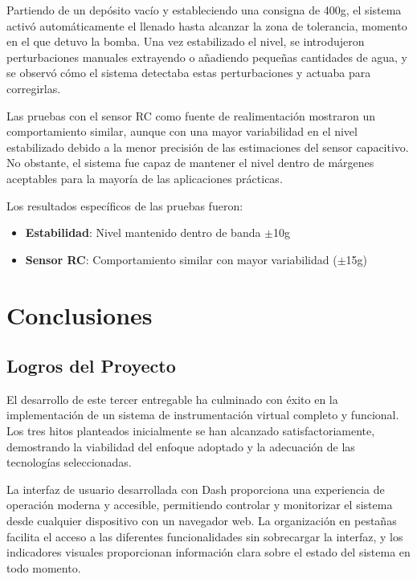 \documentclass[12pt,a4paper]{article}
\begin{document}
Partiendo de un depósito vacío y estableciendo una consigna de 400g, el sistema activó automáticamente el llenado hasta alcanzar la zona de tolerancia, momento en el que detuvo la bomba. Una vez estabilizado el nivel, se introdujeron perturbaciones manuales extrayendo o añadiendo pequeñas cantidades de agua, y se observó cómo el sistema detectaba estas perturbaciones y actuaba para corregirlas.

Las pruebas con el sensor RC como fuente de realimentación mostraron un comportamiento similar, aunque con una mayor variabilidad en el nivel estabilizado debido a la menor precisión de las estimaciones del sensor capacitivo. No obstante, el sistema fue capaz de mantener el nivel dentro de márgenes aceptables para la mayoría de las aplicaciones prácticas.

Los resultados específicos de las pruebas fueron:

\begin{itemize}
    \item \textbf{Estabilidad}: Nivel mantenido dentro de banda $\pm$10g
    \item \textbf{Sensor RC}: Comportamiento similar con mayor variabilidad ($\pm$15g)
\end{itemize}

\section{Conclusiones}

\subsection{Logros del Proyecto}

El desarrollo de este tercer entregable ha culminado con éxito en la implementación de un sistema de instrumentación virtual completo y funcional. Los tres hitos planteados inicialmente se han alcanzado satisfactoriamente, demostrando la viabilidad del enfoque adoptado y la adecuación de las tecnologías seleccionadas.

La interfaz de usuario desarrollada con Dash proporciona una experiencia de operación moderna y accesible, permitiendo controlar y monitorizar el sistema desde cualquier dispositivo con un navegador web. La organización en pestañas facilita el acceso a las diferentes funcionalidades sin sobrecargar la interfaz, y los indicadores visuales proporcionan información clara sobre el estado del sistema en todo momento.
\end{document}
